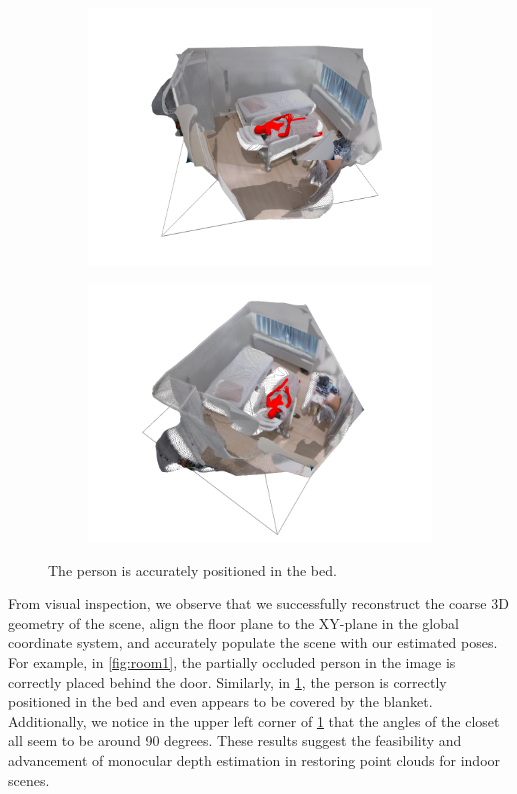 \begin{figure}[H]
    \centering
    \begin{subfigure}[b]{0.49\linewidth}
        \includegraphics[width=\linewidth]{figures/results/room3.png}
    \end{subfigure}
    \hfill
    \begin{subfigure}[b]{0.49\linewidth}
        \includegraphics[width=\linewidth]{figures/results/room4.png}
    \end{subfigure}
    \caption{The person is accurately positioned in the bed.}
    \label{fig:room2}
\end{figure}
From visual inspection, we observe that we successfully reconstruct the coarse 3D geometry of the scene, align the floor plane to the XY-plane in the global coordinate system, and accurately populate the scene with our estimated poses. For example, in \cref{fig:room1}, the partially occluded person in the image is correctly placed behind the door. Similarly, in \cref{fig:room2}, the person is correctly positioned in the bed and even appears to be covered by the blanket. Additionally, we notice in the upper left corner of \cref{fig:room2} that the angles of the closet all seem to be around 90 degrees. These results suggest the feasibility and advancement of monocular depth estimation in restoring point clouds for indoor scenes. 


